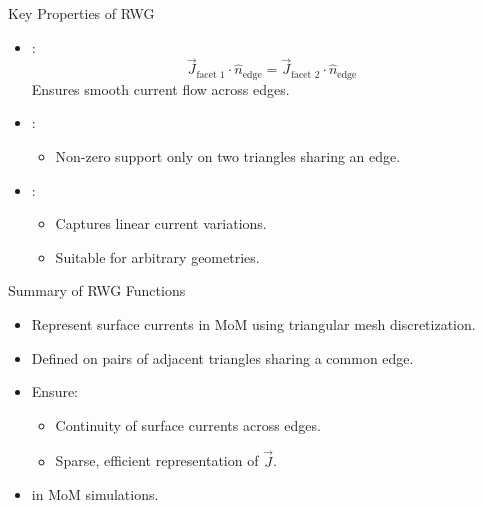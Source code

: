 \begin{frame}{Key Properties of RWG}
    \begin{itemize}
        \item {}:
\begin{equation}
\vec{J}_\text{facet 1} \cdot \hat{n}_\text{edge} = \vec{J}_\text{facet 2} \cdot \hat{n}_\text{edge} \tag{4}
\end{equation}
            Ensures smooth current flow across edges.
        \item {}:
            \begin{itemize}
                \item Non-zero support only on two triangles sharing an edge.
            \end{itemize}
        \item {}:
            \begin{itemize}
                \item Captures linear current variations.
                \item Suitable for arbitrary geometries.
            \end{itemize}
    \end{itemize}
\end{frame}

\begin{frame}{Summary of RWG Functions}
    \begin{itemize}
        \item Represent surface currents in MoM using triangular mesh discretization.
        \item Defined on pairs of adjacent triangles sharing a common edge.
        \item Ensure:
            \begin{itemize}
                \item Continuity of surface currents across edges.
                \item Sparse, efficient representation of \(\vec{J}\).
            \end{itemize}
        \item {} in MoM simulations.
    \end{itemize}
\end{frame}

